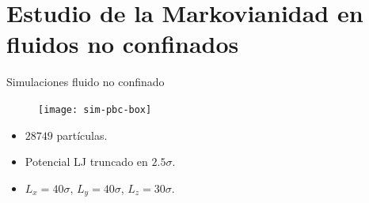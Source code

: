 \documentclass{beamer}
\begin{document}
\section{Estudio de la Markovianidad en fluidos no confinados}
\begin{frame}{Simulaciones fluido no confinado}
  \begin{center}
  \begin{figure}
    \texttt{[image: sim-pbc-box]}
\end{figure}
    \begin{itemize}
     \item $28749$ partículas.
     \item Potencial LJ truncado en $2.5\sigma$.
     \item $L_{x}=40\sigma$, $L_{y}=40\sigma$, $L_{z}=30\sigma$.
    \end{itemize}
  \end{center}
\end{frame}
\end{document}
